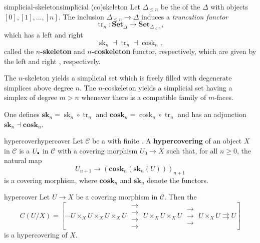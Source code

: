\begin{topic}{simplicial-skeleton}{simplicial (co)skeleton}
    Let $\Delta_{\le n}$ be the  of the  $\Delta$ with objects $[0], [1], \ldots, [n]$. The inclusion $\Delta_{\le n} \to \Delta$ induces a \textit{truncation functor}
    \[ \operatorname{tr}_n : \textbf{Set}_\Delta \to \textbf{Set}_{\Delta_{\le n}} , \]
    which has a left and right 
    \[ \operatorname{sk}_n \dashv \operatorname{tr}_n \dashv \operatorname{cosk}_n , \]
    called the \textbf{$n$-skeleton} and \textbf{$n$-coskeleton} functor, respectively, which are given by the left and right , respectively.
    
    The $n$-skeleton yields a simplicial set which is freely filled with degenerate simplices above degree $n$. The $n$-coskeleton yields a simplicial set having a simplex of degree $m > n$ whenever there is a compatible family of $m$-faces.
    
    One defines $\textbf{sk}_n = \operatorname{sk}_n \circ \operatorname{tr}_n$ and $\textbf{cosk}_n = \operatorname{cosk}_n \circ \operatorname{tr}_n$ and has an adjunction $\textbf{sk}_n \dashv \textbf{cosk}_n$.
\end{topic}

\begin{topic}{hypercover}{hypercover}
    Let $\mathcal{C}$ be a  with finite . A \textbf{hypercovering} of an object $X$ in $\mathcal{C}$ is a  $U_\bdot$ in $\mathcal{C}$ with a covering morphism $U_0 \to X$ such that, for all $n \ge 0$, the natural map
    \[ U_{n + 1} \to (\textbf{cosk}_n(\textbf{sk}_n(U)))_{n + 1} \]
    is a covering morphism, where $\textbf{cosk}_n$ and $\textbf{sk}_n$ denote the  functors.
\end{topic}

\begin{example}{hypercover}
    Let $U \to X$ be a covering morphism in $\mathcal{C}$. Then the 
    \[ C(U/X) = \left[ \cdots U \times_X U \times_X U \times_X U \; \substack{\rightarrow \\[-0.9em] \rightarrow \\[-0.9em] \rightarrow \\[-0.9em] \rightarrow} \; U \times_X U \times_X U \; \substack{\rightarrow \\[-0.9em] \rightarrow \\[-0.9em] \rightarrow} \; U \times_X U \rightrightarrows U \right] \]
    is a hypercovering of $X$.
\end{example}
